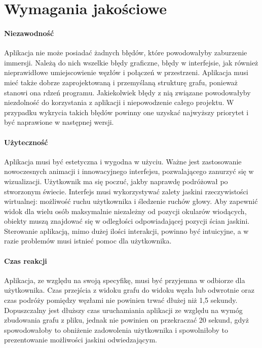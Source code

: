 \section{Wymagania jakościowe}

\paragraph{Niezawodność}
Aplikacja nie może posiadać żadnych błędów, które powodowałyby zaburzenie immersji. Należą do nich wszelkie błędy graficzne, błędy w interfejsie, jak również nieprawidłowe umiejscowienie węzłów i połączeń w przestrzeni. Aplikacja musi mieć także dobrze zaprojektowaną i przemyślaną strukturę grafu, ponieważ stanowi ona rdzeń programu. Jakiekolwiek błędy z nią związane powodowałyby niezdolność do korzystania z aplikacji i niepowodzenie całego projektu. W przypadku wykrycia takich błędów powinny one uzyskać najwyższy priorytet i być naprawione w następnej wersji.

\paragraph{Użyteczność}
Aplikacja musi być estetyczna i wygodna w użyciu. Ważne jest zastosowanie nowoczesnych animacji i innowacyjnego interfejsu, pozwalającego zanurzyć się w wizualizacji. Użytkownik ma się poczuć, jakby naprawdę podróżował po stworzonym świecie. Interfejs musi wykorzystywać zalety jaskini rzeczywistości wirtualnej: możliwość ruchu użytkownika i śledzenie ruchów głowy. Aby zapewnić widok dla wielu osób maksymalnie niezależny od pozycji okularów wiodących, obiekty muszą znajdować się w odległości odpowiadającej pozycji ścian jaskini. Sterowanie aplikacją, mimo dużej ilości interakcji, powinno być intuicyjne, a w razie problemów musi istnieć pomoc dla użytkownika.

\paragraph{Czas reakcji}
Aplikacja, ze względu na swoją specyfikę, musi być przyjemna w odbiorze dla użytkownika. Czas przejścia z widoku grafu do widoku węzła lub odwrotnie oraz czas podróży pomiędzy węzłami nie powinien trwać dłużej niż 1,5 sekundy. Dopuszczalny jest dłuższy czas uruchamiania aplikacji ze względu na wymóg zbudowania grafu z pliku, jednak nie powinien on przekraczać 20 sekund, gdyż spowodowałoby to obniżenie zadowolenia użytkownika i spowolniłoby to prezentowanie możliwości jaskini odwiedzającym. 

